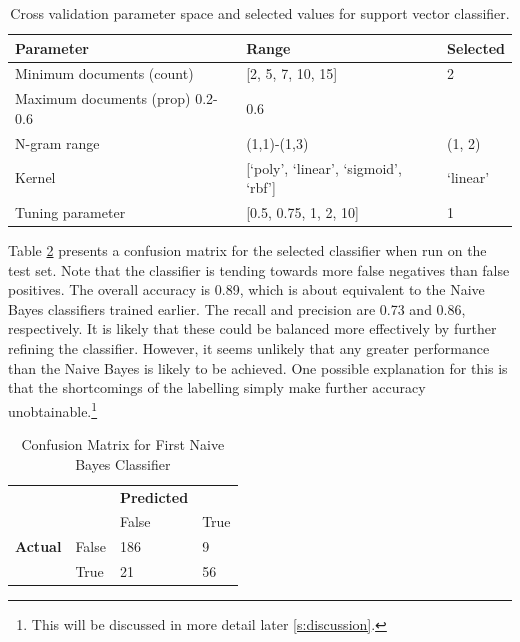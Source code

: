 \documentclass{article}
\begin{document}
\begin{table}[]
        \centering
        \footnotesize
        \begin{tabular}{l|ll}
          Parameter & Range & Selected \\
          \hline
          Minimum documents (count) & [2, 5, 7, 10, 15] & 2 \\ %
          Maximum documents (prop) 0.2-0.6 & 0.6 \\
          N-gram range & (1,1)-(1,3) & (1, 2) \\
          Kernel & [`poly', `linear', `sigmoid', `rbf'] & `linear' \\
          Tuning parameter & [0.5, 0.75, 1, 2, 10] & 1
        \end{tabular}
        \caption{Cross validation parameter space and selected values for support vector classifier.}
        \label{t:svm-cv}
\end{table}

Table \ref{t:svc-confusion} presents a confusion matrix for the selected classifier when run on the test set. Note that the classifier is tending towards more false negatives than false positives. The overall accuracy is 0.89, which is about equivalent to the Naive Bayes classifiers trained earlier. The recall and precision are 0.73 and 0.86, respectively. It is likely that these could be balanced more effectively by further refining the classifier. However, it seems unlikely that any greater performance than the Naive Bayes is likely to be achieved. One possible explanation for this is that the shortcomings of the labelling simply make further accuracy unobtainable.\footnote{This will be discussed in more detail later \ref{s:discussion}.}


\begin{table}[]
        \centering
        \footnotesize
        \begin{tabular}{ll|ll}
        & & \textbf{Predicted} & \\
        & & False & True \\
        \hline
        \textbf{Actual} & False & 186 & 9 \\
        & True & 21 & 56 \\
        \end{tabular}
        \caption{Confusion Matrix for First Naive Bayes Classifier}
        \label{t:svc-confusion}
\end{table}
\end{document}
